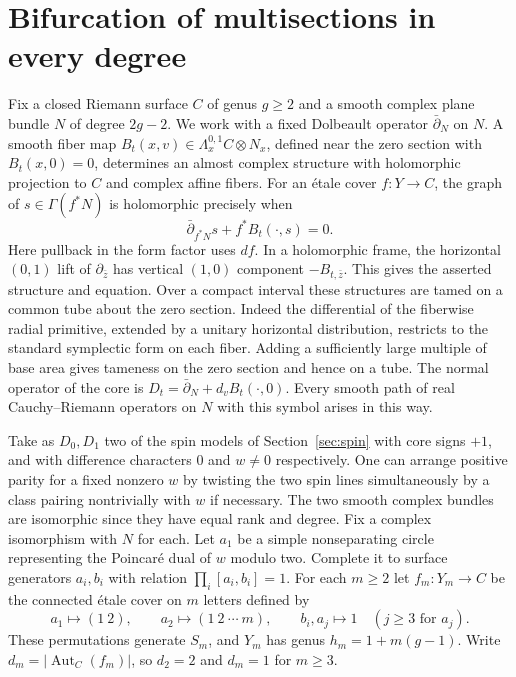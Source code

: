 \section{Bifurcation of multisections in every degree}\label{sec:walls}

Fix a closed Riemann surface $C$ of genus $g\ge2$ and a smooth complex
plane bundle $N$ of degree $2g-2$. We work with a fixed Dolbeault
operator $\bar\partial_N$ on $N$. A smooth fiber map
$B_t(x,v)\in\Lambda_x^{0,1}C\otimes N_x$, defined near the zero
section with $B_t(x,0)=0$, determines an almost complex structure with
holomorphic projection to $C$ and complex affine fibers. For an \'etale
cover $f:Y\to C$, the graph of $s\in\Gamma(f^*N)$ is holomorphic
precisely when
\begin{equation}\label{eq:wall-section}
  \bar\partial_{f^*N}s+f^*B_t(\cdot,s)=0.
\end{equation}
Here pullback in the form factor uses $df$. In a holomorphic frame,
the horizontal $(0,1)$ lift of $\partial_{\bar z}$ has vertical
$(1,0)$ component $-B_{t,\bar z}$. This gives the asserted structure
and equation. Over a compact interval these structures are tamed on
a common tube about the zero section. Indeed the differential of the
fiberwise radial primitive, extended by a unitary horizontal
distribution, restricts to the standard symplectic form on each fiber.
Adding a sufficiently large multiple of base area gives tameness on
the zero section and hence on a tube. The normal operator of the core is
$D_t=\bar\partial_N+d_vB_t(\cdot,0)$. Every smooth path of real
Cauchy--Riemann operators on $N$ with this symbol arises in this way.

Take as $D_0,D_1$ two of the spin models of Section~\ref{sec:spin}
with core signs $+1$, and with difference characters $0$ and
$w\ne0$ respectively. One can arrange positive parity for a fixed
nonzero $w$ by twisting the two spin lines simultaneously by a class
pairing nontrivially with $w$ if necessary. The two smooth complex
bundles are isomorphic since they have equal rank and degree. Fix a
complex isomorphism with $N$ for each. Let $a_1$ be a simple
nonseparating circle representing the Poincar\'e dual of $w$
modulo two. Complete it to surface generators $a_i,b_i$ with
relation $\prod_i[a_i,b_i]=1$. For each $m\ge2$ let
$f_m:Y_m\to C$ be the connected \'etale cover on $m$ letters defined by
\begin{equation}\label{eq:wall-quotient}
 a_1\longmapsto(1\ 2),\qquad a_2\longmapsto(1\ 2\ \cdots\ m),
 \qquad b_i,a_j\longmapsto 1\quad(j\ge3\text{ for }a_j).
\end{equation}
These permutations generate $S_m$, and $Y_m$ has genus
$h_m=1+m(g-1)$. Write $d_m=|\operatorname{Aut}_C(f_m)|$, so
$d_2=2$ and $d_m=1$ for $m\ge3$.

